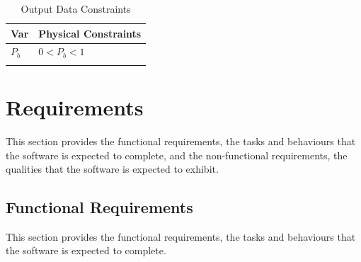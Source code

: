 \documentclass[12pt]{article}
\begin{document}
\begin{longtable}{l l}
\toprule
\textbf{Var} & \textbf{Physical Constraints}
\\
\midrule
\endhead
${P_{b}}$ & $0<{P_{b}}<1$
\\
\bottomrule
\caption{Output Data Constraints}
\label{Table:OutDataConstraints}
\end{longtable}
\section{Requirements}
\label{Sec:Requirements}
This section provides the functional requirements, the tasks and behaviours that the software is expected to complete, and the non-functional requirements, the qualities that the software is expected to exhibit.

\subsection{Functional Requirements}
\label{Sec:FRs}
This section provides the functional requirements, the tasks and behaviours that the software is expected to complete.
\end{document}

